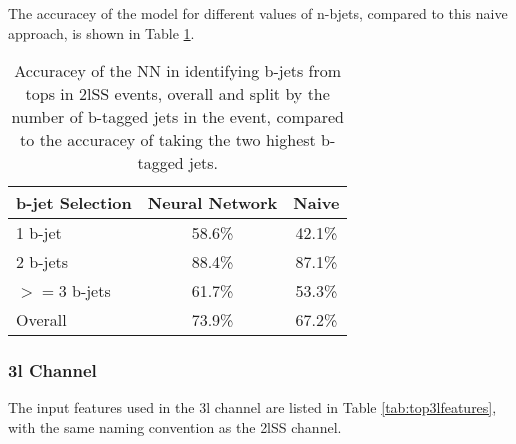 The accuracey of the model for different values of n-bjets, compared to this naive approach, is shown in Table \ref{tab:topMatchAcc2lSS}.

\begin{table}[H]
  \centering
  \begin{tabular}{l|c|c}
    \hline\hline
    b-jet Selection & Neural Network & Naive \\
    \hline
    1 b-jet & 58.6\% & 42.1\% \\
    2 b-jets & 88.4\% & 87.1\% \\
    $>=$3 b-jets & 61.7\% & 53.3\% \\
    \hline
    Overall & 73.9\% & 67.2\% \\                                                                                  
    \hline                                                                                                 
  \end{tabular}
  \caption{Accuracey of the NN in identifying b-jets from tops in 2lSS events, overall and split by the number of b-tagged jets in the event, compared to the accuracey of taking the two highest b-tagged jets.}     
  \label{tab:topMatchAcc2lSS}                                                                                           
\end{table}

\subsubsection{3l Channel}
\label{subsec:top3l}
 
The input features used in the 3l channel are listed in Table \ref{tab:top3lfeatures}, with the same naming convention as the 2lSS channel.

